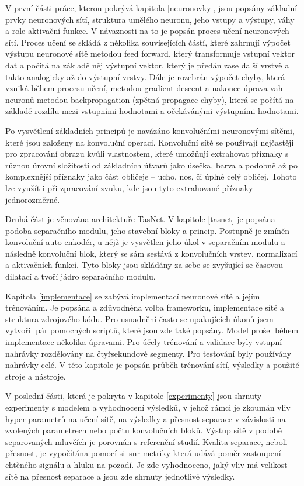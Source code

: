 V první části práce, kterou pokrývá kapitola \ref{neuronovky}, jsou popsány základní prvky neuronových sítí, struktura umělého neuronu, jeho vstupy a výstupy, váhy a role aktivační funkce. V návaznosti na to je popsán proces učení neuronových sítí. Proces učení se skládá z několika souvisejících částí, které zahrnují výpočet výstupu neuronové sítě metodou feed forward, který transformuje vstupní vektor dat a počítá na základě něj výstupní vektor, který je předán zase další vrstvě a takto analogicky až do výstupní vrstvy. Dále je rozebrán výpočet chyby, která vzniká během procesu učení, metodou gradient descent a nakonec úprava vah neuronů metodou backpropagation (zpětná propagace chyby), která se počítá na základě rozdílu mezi vstupními hodnotami a očekávánými výstupními hodnotami.

Po vysvětlení základních principů je navázáno konvolučními neuronovými sítěmi, které jsou založeny na konvoluční operaci. Konvoluční sítě se používají nejčastěji pro zpracování obrazu kvůli vlastnostem, které umožňují extrahovat příznaky s různou úrovní složitosti od základních útvarů jako úsečka, barva a podobně až po komplexnější příznaky jako část obličeje -- ucho, nos, či úplně celý obličej. Tohoto lze využít i při zpracování zvuku, kde jsou tyto extrahované příznaky jednorozměrné.

Druhá část je věnována architektuře TasNet. V kapitole \ref{tasnet} je popsána podoba separačního modulu, jeho stavební bloky a princip. Postupně je zmíněn konvoluční auto-enkodér, u nějž je vysvětlen jeho úkol v separačním modulu a následně konvoluční blok, který se sám sestává z konvolučních vrstev, normalizací a aktivačních funkcí. Tyto bloky jsou skládány za sebe se zvyšující se časovou dilatací a tvoří jádro separačního modulu.

Kapitola \ref{implementace} se zabývá implementací neuronové sítě a jejím trénováním. Je popsána a zdůvodněna volba frameworku, implementace sítě a struktura zdrojového kódu. Pro usnadnění často se upakujících úkonů jsem vytvořil pár pomocných scriptů, které jsou zde také popsány. 
Model prošel během implementace několika úpravami. Pro účely trénování a validace byly vstupní nahrávky rozdělovány na čtyřsekundové segmenty. Pro testování byly používány nahrávky celé. V této kapitole je popsán průběh trénování sítí, výsledky a použité stroje a nástroje.

V poslední části, která je pokryta v kapitole \ref{experimenty} jsou shrnuty experimenty s modelem a vyhodnocení výsledků, v jehož rámci je zkoumán vliv hyper-parametrů na učení sítě, na výsledky a přesnost separace v závislosti na zvolených parametrech nebo počtu konvolučních bloků. Výstup sítě v podobě separovaných mluvčích je porovnán s referenční studií. Kvalita separace, neboli přesnost, je vypočítána pomocí si--snr metriky která udává poměr zastoupení chtěného signálu a hluku na pozadí. Je zde vyhodnoceno, jaký vliv má velikost sítě na přesnost separace a jsou zde shrnuty jednotlivé výsledky.

